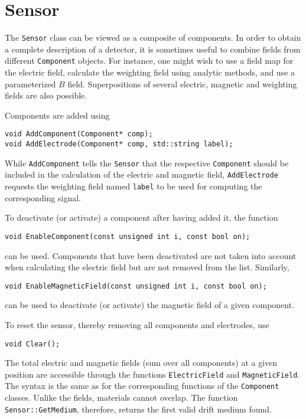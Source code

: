 \section{Sensor}

The \texttt{Sensor} class can be viewed as a composite of components. 
In order to obtain a complete description of a detector, 
it is sometimes useful to combine fields from different 
\texttt{Component} objects.
For instance, one might wish to use a field map for the electric field, 
calculate the weighting field using analytic methods, 
and use a parameterized \(B\) field. 
Superpositions of several electric, magnetic and weighting fields are also possible. 


Components are added using
\begin{lstlisting}
void AddComponent(Component* comp);
void AddElectrode(Component* comp, std::string label);
\end{lstlisting}
While \texttt{AddComponent} tells the \texttt{Sensor} that the 
respective \texttt{Component} should be included in the calculation 
of the electric and magnetic field, 
\texttt{AddElectrode} requests the weighting field named \texttt{label} 
to be used for computing the corresponding signal.

To deactivate (or activate) a component after having added it, the 
function
\begin{lstlisting}
void EnableComponent(const unsigned int i, const bool on);
\end{lstlisting}
can be used. Components that have been deactivated are not taken into 
account when calculating the electric field but are not removed from the list.
Similarly, 
\begin{lstlisting}
void EnableMagneticField(const unsigned int i, const bool on);
\end{lstlisting}
can be used to deactivate (or activate) the magnetic field of a 
given component. 

To reset the sensor, thereby removing all components and electrodes, use
\begin{lstlisting}
void Clear();
\end{lstlisting}

The total electric and magnetic fields 
(sum over all components) at a given position are accessible through 
the functions \texttt{ElectricField} and \texttt{MagneticField}.
The syntax is the same as for the corresponding functions of the 
\texttt{Component} classes.
Unlike the fields, materials cannot overlap. 
The function \texttt{Sensor::GetMedium}, therefore, 
returns the first valid drift medium found. 
 
